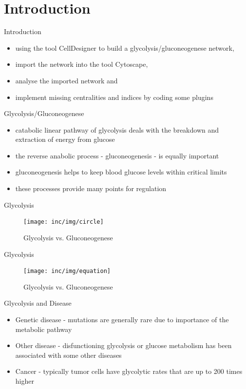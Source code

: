 \section{Introduction}

\begin{frame}{Introduction}
	\begin{itemize}
		\item using the tool CellDesigner to build a glycolysis/gluconeogenese network,
		\item import the network into the tool Cytoscape,
		\item analyse the imported network and
		\item implement missing centralities and indices by coding some plugins
	\end{itemize}
\end{frame}

\begin{frame}{Glycolysis/Gluconeogenese}
	\begin{itemize}
		\item catabolic linear pathway of glycolysis deals with the breakdown and extraction of energy from glucose
		\item the reverse anabolic process - gluconeogenesis - is equally important
		\item gluconeogenesis helps to keep blood glucose levels within critical limits
		\item these processes provide many points for regulation
	\end{itemize}
\end{frame}

\begin{frame}{Glycolysis}
	\begin{figure}[htbp]
	   \centering
	   \texttt{[image: inc/img/circle]}
	   \caption{Glycolysis vs. Gluconeogenese}
	   \label{fig:circle}
	\end{figure}
\end{frame}

\begin{frame}{Glycolysis}
	\begin{figure}[htbp]
	   \centering
	   \texttt{[image: inc/img/equation]}
	   \caption{Glycolysis vs. Gluconeogenese}
	   \label{fig:circle}
	\end{figure}
\end{frame}

\begin{frame}{Glycolysis and Disease}
	\begin{itemize}
		\item Genetic disease - mutations are generally rare due to importance of the metabolic pathway
		\item Other disease - disfunctioning glycolysis or glucose metabolism has been associated with some other diseases
		\item Cancer - typically tumor cells have glycolytic rates that are up to 200 times higher

	\end{itemize}
\end{frame}

